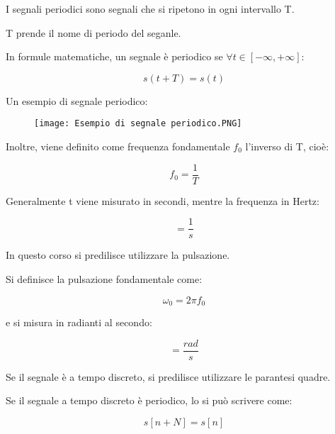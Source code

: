 I segnali periodici sono segnali che si ripetono in ogni intervallo T. \newline 

T prende il nome di periodo del seganle. \newline 

In formule matematiche, un segnale è periodico se $\forall t \in [-\infty, +\infty]$: 

{
    \Large 
    \begin{equation}
        s(t + T) = s(t)
    \end{equation}
}

Un esempio di segnale periodico: 

\begin{figure}[h]
    \centering
    \texttt{[image: Esempio di segnale periodico.PNG]}
\end{figure}  


Inoltre, viene definito come frequenza fondamentale $f_0$ l'inverso di T, cioè: 

{
    \Large 
    \begin{equation}
        f_0 = \frac{1}{T}
    \end{equation}
}

Generalmente t viene misurato in secondi, mentre la frequenza in Hertz: 

{
    \Large
    \begin{equation}
        [Hz] = \frac{1}{s}
    \end{equation}
}

In questo corso si predilisce utilizzare la pulsazione. \newline 

Si definisce la pulsazione fondamentale come: 

{
    \Large 
    \begin{equation}
        \omega_0 = 2\pi f_0
    \end{equation}
} 

e si misura in radianti al secondo: 

{
    \Large 
    \begin{equation}
        [\omega_0] = \frac{rad}{s}
    \end{equation}
}

Se il segnale è a tempo discreto, si predilisce utilizzare le parantesi quadre. \newline 

Se il segnale a tempo discreto è periodico, lo si può scrivere come: 

{
    \Large 
    \begin{equation}
        s[n + N] = s[n]
    \end{equation}
}

